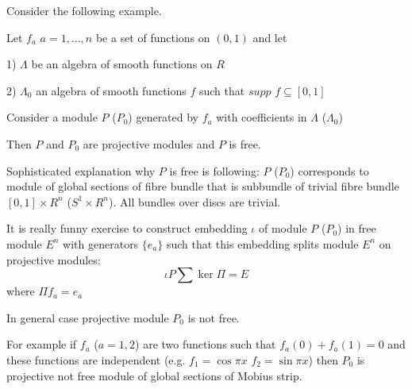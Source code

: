 \def\L{\Lambda}
  Consider the following example.

  Let $f_a$ $a=1,\dots,n$ be a set of functions on $(0,1)$
  and let

  1) $\L$ be an algebra of smooth functions on $R$

  2) $\L_0$ an algebra of smooth functions $f$ such that $supp\,\, f\subseteq [0,1]$


  Consider a module $P$ ($P_0$) generated by $f_a$ with
  coefficients
  in $\L$ ($\L_0$)

  Then $P$ and $P_0$ are projective modules and $P$ is free.

  Sophisticated explanation why $P$ is free is following:
  $P$ ($P_0$) corresponds to module of global sections of fibre bundle
  that is subbundle of trivial fibre bundle $[0,1]\times R^n$
  ($S^1\times R^n$). All bundles over discs are trivial.



  It is really funny exercise to construct embedding
  $\iota$ of module $P$ ($P_0$) in free module $E^n$
  with generators $\{e_a\}$ such that this embedding
  splits module $E^n$ on projective modules:
                 $$
      \iota P\sum \ker\Pi=E
                   $$
     where $\Pi f_a=e_a$

  In general case projective module $P_0$ is not free.

    For example if $f_a$ ($a=1,2$) are two functions
    such that $f_a(0)+f_a(1)=0$ and these functions
    are independent (e.g. $f_1=\cos \pi x$ $f_2=\sin \pi x$)
    then $P_0$ is projective not free module of global
    sections of Mobius strip.



\bye

